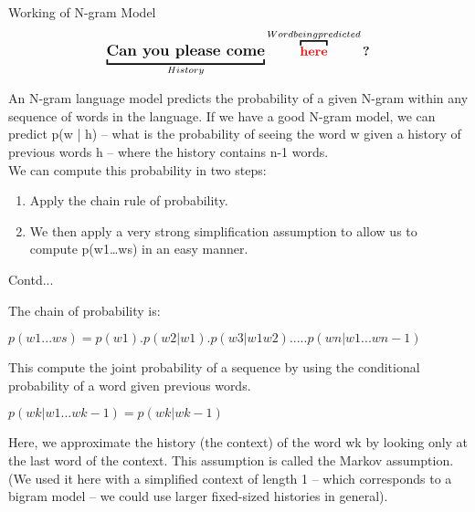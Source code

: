 \documentclass{beamer}
\begin{document}
\begin{frame}{Working of N-gram Model}
\[
	\underbracket{\textbf{\large Can you please come}}_{History} \overbracket{\textbf{\textcolor{red}{here}}}^{Word being predicted}\textbf{?}
\]
\begin{flushleft}
An N-gram language model predicts the probability of a given N-gram within any sequence of words in the language. If we have a good N-gram model, we can predict p(w | h) – what is the probability of seeing the word w given a history of previous words h – where the history contains n-1 words.\\
We can compute this probability in two steps:
\begin{enumerate}
	\item Apply the chain rule of probability.
	\item We then apply a very strong simplification assumption to allow us to compute p(w1…ws) in an easy manner.
\end{enumerate}
\end{flushleft}
\end{frame}

\begin{frame}{Contd...}
\begin{flushleft}
The chain of probability is:\\
\end{flushleft}
$p(w1...ws) = p(w1) . p(w2|w1) . p(w3|w1w2) ..... p(wn | w1...wn-1) $\\
\begin{flushleft}
This compute the joint probability of a sequence by using the conditional probability of a word given previous words.
\end{flushleft}
	$p(wk | w1...wk-1) = p(wk | wk-1)$
\begin{flushleft}
	Here, we approximate the history (the context) of the word wk by looking only at the last word of the context. This assumption is called the Markov assumption. (We used it here with a simplified context of length 1 – which corresponds to a bigram model – we could use larger fixed-sized histories in general).
\end{flushleft}
\end{frame}
\end{document}
